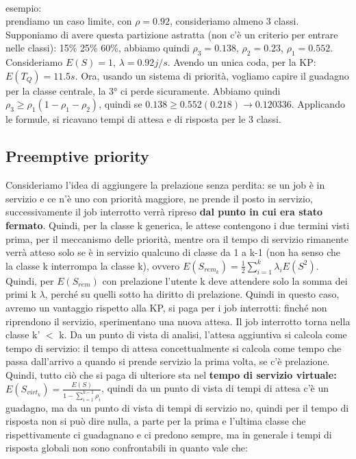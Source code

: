 \documentclass{article}
\begin{document}
\\ esempio: \\ prendiamo un caso limite, con $\rho = 0.92$, consideriamo almeno 3 classi. Supponiamo di avere questa partizione astratta (non c'è un criterio per entrare nelle classi): 15\% 25\% 60\%, abbiamo quindi $\rho_3 = 0.138$, $\rho_2 = 0.23$, $\rho_1 = 0.552$. Consideriamo $E(S) = 1$, $\lambda = 0.92 j/s$. Avendo un unica coda, per la KP: $E(T_Q) = 11.5 s$. Ora, usando un sistema di priorità, vogliamo capire il guadagno per la classe centrale, la 3° ci perde sicuramente. Abbiamo quindi $\rho_3 \geq \rho_1(1 - \rho_1 - \rho_2)$, quindi se $0.138 \geq 0.552(0.218) \rightarrow 0.120336$. Applicando le formule, si ricavano tempi di attesa e di risposta per le 3 classi.
\subsection{Preemptive priority}
Consideriamo l'idea di aggiungere la prelazione senza perdita: se un job è in servizio e ce n'è uno con priorità maggiore, ne prende il posto in servizio, successivamente il job interrotto verrà ripreso \textbf{dal punto in cui era stato fermato}. Quindi, per la classe k generica, le attese contengono i due termini visti prima, per il meccanismo delle priorità, mentre ora il tempo di servizio rimanente verrà atteso solo se è in servizio qualcuno di classe da 1 a k-1 (non ha senso che la classe k interrompa la classe k), ovvero $E(S_{rem_k}) = \frac{1}{2} \sum\limits_{i=1}^{k} \lambda_i E(S^2)$. Quindi, per $E(S_{rem})$ con prelazione l'utente k deve attendere solo la somma dei primi k $\lambda$, perché su quelli sotto ha diritto di prelazione. Quindi in questo caso, avremo un vantaggio rispetto alla KP, si paga per i job interrotti: finché non riprendono il servizio, sperimentano una nuova attesa. Il job interrotto torna nella classe k' $<$ k. Da un punto di vista di analisi, l'attesa aggiuntiva si calcola come tempo di servizio: il tempo di attesa concettualmente si calcola come tempo che passa dall'arrivo a quando si prende servizio la prima volta, se c'è prelazione. Quindi, tutto ciò che si paga di ulteriore sta nel \textbf{tempo di servizio virtuale:} $E(S_{virt_k}) = \frac{E(S)}{1 - \sum\limits_{i=1}^{k-1} \rho_i}$, quindi da un punto di vista di tempi di attesa c'è un guadagno, ma da un punto di vista di tempi di servizio no, quindi per il tempo di risposta non si può dire nulla, a parte per la prima e l'ultima classe che rispettivamente ci guadagnano e ci predono sempre, ma in generale i tempi di risposta globali non sono confrontabili in quanto vale che:
\end{document}
